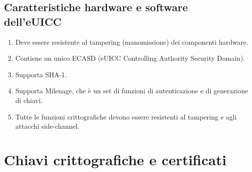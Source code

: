 \documentclass[10pt, oneside]{book}
\begin{document}
\subsection{Caratteristiche hardware e software dell'eUICC}
\begin{enumerate}[itemsep=0pt]
\item Deve essere resistente al tampering (manomissione) dei componenti hardware.
\item Contiene un unico ECASD (eUICC Controlling Authority Security Domain).
\item Supporta SHA-1.
\item Supporta Milenage, che è un set di funzioni di autenticazione e di generazione di chiavi.
\item Tutte le funzioni crittografiche devono essere resistenti al tampering e agli attacchi side-channel.
\end{enumerate}

\section{Chiavi crittografiche e certificati}
\end{document}
